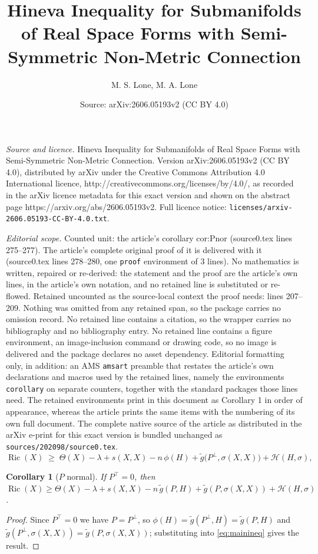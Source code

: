 \documentclass[10pt,a4paper]{amsart}
\title{Hineva Inequality for Submanifolds of Real Space Forms with Semi-Symmetric Non-Metric Connection}
\author{M. S. Lone, M. A. Lone}
\date{Source: arXiv:2606.05193v2 (CC BY 4.0)}
\newtheorem{corollary}{Corollary}
\newcommand{\HH}{\mathcal{H}}
\newcommand{\Ric}{\operatorname{Ric}}
\newcommand{\tg}{\widetilde{g}}
\begin{document}
\maketitle

\noindent\emph{Source and licence.} Hineva Inequality for Submanifolds of Real Space Forms with Semi-Symmetric Non-Metric Connection. Version arXiv:2606.05193v2 (CC BY 4.0), distributed by arXiv under the Creative Commons Attribution 4.0 International licence, http://creativecommons.org/licenses/by/4.0/, as recorded in the arXiv licence metadata for this exact version and shown on the abstract page https://arxiv.org/abs/2606.05193v2. Full licence notice: \texttt{licenses/arxiv-2606.05193-CC-BY-4.0.txt}.\par\smallskip

\noindent\textit{Editorial scope.} Counted unit: the article's corollary cor:Pnor (source0.tex lines 275--277). The article's complete original proof of it is delivered with it (source0.tex lines 278--280, one \texttt{proof} environment of 3 lines). No mathematics is written, repaired or re-derived: the statement and the proof are the article's own lines, in the article's own notation, and no retained line is substituted or re-flowed.  Retained uncounted as the source-local context the proof needs: lines 207--209.  Nothing was omitted from any retained span, so the package carries no omission record.  No retained line contains a citation, so the wrapper carries no bibliography and no bibliography entry.  No retained line contains a figure environment, an image-inclusion command or drawing code, so no image is delivered and the package declares no asset dependency.  Editorial formatting only, in addition: an AMS \texttt{amsart} preamble that restates the article's own declarations and macros used by the retained lines, namely the environments \texttt{corollary} on separate counters, together with the standard packages those lines need.  The retained environments print in this document as Corollary 1 in order of appearance, whereas the article prints the same items with the numbering of its own full document.  The complete native source of the article as distributed in the arXiv e-print for this exact version is bundled unchanged as \texttt{sources/202098/source0.tex}.
\begin{equation}\label{eq:mainineq}
\Ric(X)\;\ge\;\Theta(X)-\lambda+s(X,X)-n\,\phi(H)+\tg\bigl(P^\perp,\sigma(X,X)\bigr)+\HH(H,\sigma),
\end{equation}

\begin{corollary}[$P$ normal]\label{cor:Pnor}
If $P^\top=0$, then $\Ric(X)\ge\Theta(X)-\lambda+s(X,X)-n\,\tg(P,H)+\tg(P,\sigma(X,X))+\HH(H,\sigma)$.
\end{corollary}

\begin{proof}
Since $P^\top=0$ we have $P=P^\perp$, so $\phi(H)=\tg(P^\perp,H)=\tg(P,H)$ and $\tg(P^\perp,\sigma(X,X))=\tg(P,\sigma(X,X))$; substituting into \eqref{eq:mainineq} gives the result.
\end{proof}
\end{document}

